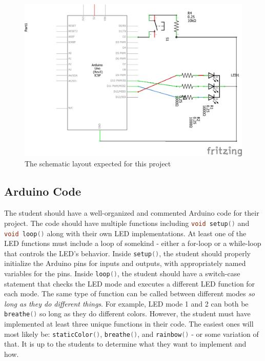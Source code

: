 \documentclass{article}
\begin{document}
    \begin{figure}[ht!]
        \centering
        \includegraphics[]{p1_rgb_led_sch.png}
        \caption{The schematic layout expected for this project}
        \label{fig:rgb_led_sch}
    \end{figure}

    \subsection*{Arduino Code}

    The student should have a well-organized and commented Arduino code for their project. 
    The code should have multiple functions including \lstinline[language=C++, style=mystyle]{void setup()} and \lstinline[language=C++, style=mystyle]{void loop()} along with their own LED implementations. 
    At least one of the LED functions must include a loop of somekind - either a for-loop or a while-loop that controls the LED's behavior.
    Inside \lstinline[language=C++, style=mystyle]{setup()}, the student should properly initialize the Arduino pins for inputs and outputs, with appropriately named variables for the pins. 
    Inside \lstinline[language=C++, style=mystyle]{loop()}, the student should have a switch-case statement that checks the LED mode and executes a different LED function for each mode.
    The same type of function can be called between different modes \emph{so long as they do different things}. 
    For example, LED mode 1 and 2 can both be \lstinline[language=C++, style=mystyle]{breathe()} so long as they do different colors.
    However, the student must have implemented at least three unique functions in their code.
    The easiest ones will most likely be: \lstinline[language=C++, style=mystyle]{staticColor()}, \lstinline[language=C++, style=mystyle]{breathe()}, and \lstinline[language=C++, style=mystyle]{rainbow()} - or some variation of that.
    It is up to the students to determine what they want to implement and how.
\end{document}
